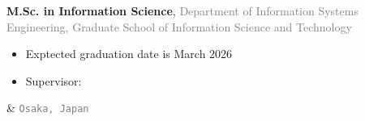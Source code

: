 \documentclass[9pt,a4paper]{article}
\begin{document}
\begin{EntriesTableRight}



  \textbf{M.Sc.\! in Information Science}, \OU
  \vspace{-0.1em}
  \newline
  \textcolor{gray}{{\fontsize{9pt}{0}\selectfont Department of Information Systems Engineering, Graduate School of Information Science and Technology}}
  \vspace{-0.1em}
  \newline
  {\setlength{\leftmargini}{17.2pt}
  \begin{itemize}
  \vspace{-1.0em}
      \item Exptected graduation date is March 2026
      \item Supervisor: \Prof{\YSakurai}
  \vspace{-1.3em}
  \end{itemize}}
  &
  \hfill
  \vspace{0.5em}
  \newline
  \hfill
  \textcolor{gray}{\fontsize{9pt}{0}\selectfont \texttt{Osaka, \!\!Japan}~}
  \\[4.45em]



\end{EntriesTableRight}
\end{document}

